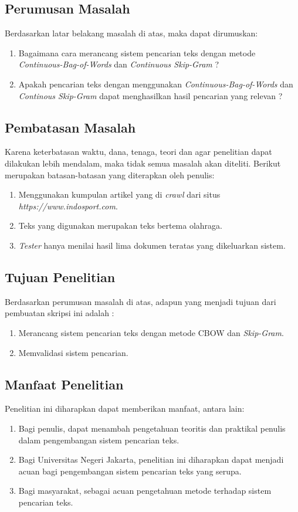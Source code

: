 \documentclass[12pt]{report}
\begin{document}
\subsection{Perumusan Masalah}
Berdasarkan latar belakang masalah di atas, maka dapat dirumuskan:
\begin{enumerate}
\item Bagaimana cara merancang sistem pencarian teks dengan metode \textit{Continuous-Bag-of-Words} dan \textit{Continuous Skip-Gram} ?
\item Apakah pencarian teks dengan menggunakan \textit{Continuous-Bag-of-Words} dan \textit{Continous Skip-Gram} dapat menghasilkan hasil pencarian yang relevan ?
\end{enumerate}

\subsection{Pembatasan Masalah}
Karena keterbatasan waktu, dana, tenaga, teori dan agar penelitian dapat dilakukan lebih mendalam, maka tidak semua masalah akan diteliti. Berikut merupakan batasan-batasan yang diterapkan oleh penulis:
\begin{enumerate}
\item Menggunakan kumpulan artikel yang di \textit{crawl} dari situs \textit{https://www.indosport.com}.
\item Teks yang digunakan merupakan teks bertema olahraga.
\item \textit{Tester} hanya menilai hasil lima dokumen teratas yang dikeluarkan sistem.
\end{enumerate}

\subsection{Tujuan Penelitian}
Berdasarkan perumusan masalah di atas, adapun yang menjadi tujuan dari pembuatan skripsi ini adalah :
\begin{enumerate}
\item Merancang sistem pencarian teks dengan metode CBOW dan \textit{Skip-Gram}.
\item Memvalidasi sistem pencarian.
\end{enumerate}


\subsection{Manfaat Penelitian}
Penelitian ini diharapkan dapat memberikan manfaat, antara lain:
\begin{enumerate}
\item Bagi penulis, dapat menambah pengetahuan teoritis dan praktikal penulis dalam pengembangan sistem pencarian teks.
\item Bagi Universitas Negeri Jakarta, penelitian ini diharapkan dapat menjadi acuan bagi pengembangan sistem pencarian teks yang serupa.
\item Bagi masyarakat, sebagai acuan pengetahuan metode terhadap sistem pencarian teks.
\end{enumerate}
\end{document}
